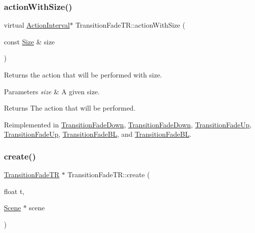 \subsubsection{\texorpdfstring{action\+With\+Size()}{actionWithSize()}\hspace{0.1cm}{\footnotesize\ttfamily [2/2]}}
{\footnotesize\ttfamily virtual \hyperlink{classActionInterval}{Action\+Interval}$\ast$ Transition\+Fade\+T\+R\+::action\+With\+Size (\begin{DoxyParamCaption}\item[{const \hyperlink{classSize}{Size} \&}]{size }\end{DoxyParamCaption})\hspace{0.3cm}{\ttfamily [virtual]}}

Returns the action that will be performed with size.


\begin{DoxyParams}{Parameters}
{\em size} & A given size. \\
\hline
\end{DoxyParams}
\begin{DoxyReturn}{Returns}
The action that will be performed. 
\end{DoxyReturn}


Reimplemented in \hyperlink{classTransitionFadeDown_a7cc0da579b09b7595ea875acdccb94e3}{Transition\+Fade\+Down}, \hyperlink{classTransitionFadeDown_aa0c84d6a674134fc9a24d9e796f7cc0b}{Transition\+Fade\+Down}, \hyperlink{classTransitionFadeUp_a3657902d0401d39788d7c15a2b8485e1}{Transition\+Fade\+Up}, \hyperlink{classTransitionFadeUp_a431d43ddd9acbf1854404a036063080e}{Transition\+Fade\+Up}, \hyperlink{classTransitionFadeBL_a2669695f07ed13e35046a1507e91abe6}{Transition\+Fade\+BL}, and \hyperlink{classTransitionFadeBL_a6701b53ec643eb3fc9e078c0feaf71b0}{Transition\+Fade\+BL}.

\mbox{\label{classTransitionFadeTR_a3439906e5b3c616eec3f7821371e42b5}} 
\subsubsection{\texorpdfstring{create()}{create()}\hspace{0.1cm}{\footnotesize\ttfamily [1/2]}}
{\footnotesize\ttfamily \hyperlink{classTransitionFadeTR}{Transition\+Fade\+TR} $\ast$ Transition\+Fade\+T\+R\+::create (\begin{DoxyParamCaption}\item[{float}]{t,  }\item[{\hyperlink{classScene}{Scene} $\ast$}]{scene }\end{DoxyParamCaption})\hspace{0.3cm}{\ttfamily [static]}}

